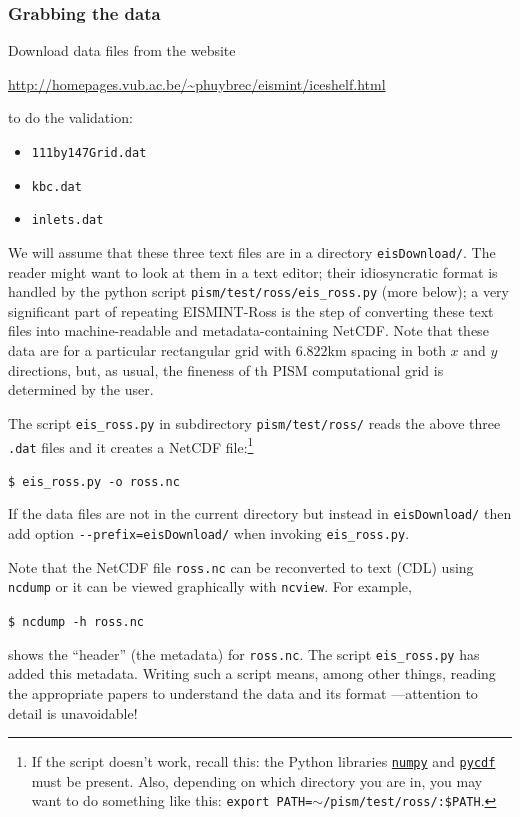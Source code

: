 \documentclass[11pt,final]{amsart}
\begin{document}
\subsubsection*{Grabbing the data}  Download data files from the website

\centerline{\url{http://homepages.vub.ac.be/~phuybrec/eismint/iceshelf.html}}

\noindent to do the validation:
\begin{itemize}
\item \verb|111by147Grid.dat|
\item \verb|kbc.dat|
\item \verb|inlets.dat|
\end{itemize}
We will assume that these three text files are in a directory \verb|eisDownload/|.  The reader might want to look at them in a text editor; their idiosyncratic format is handled by the python script \verb|pism/test/ross/eis_ross.py| (more below); a very significant part of repeating EISMINT-Ross is the step of converting these text files into machine-readable and metadata-containing NetCDF.  Note that these data are for a particular rectangular grid with $6.822$km spacing in both $x$ and $y$ directions, but, as usual, the fineness of th PISM computational grid is determined by the user.

The script \verb|eis_ross.py| in subdirectory \verb|pism/test/ross/| reads the above three \verb|.dat| files and it creates a NetCDF file:\footnote{If the script doesn't work, recall this: the Python libraries \href{http://numpy.scipy.org/}{\texttt{numpy}} and \href{http://pysclint.sourceforge.net/pycdf/}{\texttt{pycdf}} must be present.  Also, depending on which directory you are in, you may want to do something like this: \texttt{export PATH=$\sim$/pism/test/ross/:\$PATH}.}

\verb|$ eis_ross.py -o ross.nc|

\noindent If the data files are not in the current directory but instead in \verb|eisDownload/| then add option \verb|--prefix=eisDownload/| when invoking \verb|eis_ross.py|.  

Note that the NetCDF file \verb|ross.nc| can be reconverted to text (CDL) using \verb|ncdump| or it can be viewed graphically with \verb|ncview|.  For example,

\verb|$ ncdump -h ross.nc|

\noindent shows the ``header'' (the metadata) for \verb|ross.nc|.  The script \verb|eis_ross.py| has added this metadata.  Writing such a script means, among other things, reading the appropriate papers to understand the data and its format \cite{RIGGS2,RIGGS1,MacAyealetal}---attention to detail is unavoidable!
\end{document}

